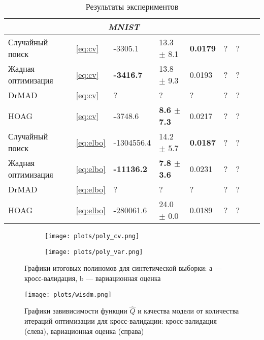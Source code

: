 \begin{table}
\begin{tabularx}{\textwidth}{ |X|X|X|X|X|X|X|X|X|}
\multicolumn{7}{|c|}{\textit{MNIST}}  \\
\hline
Случайный поиск & ~\eqref{eq:cv} & -3305.1  & 13.3 $\pm$ 8.1  &  \bf 0.0179 & ? & ? \\
\hline
Жадная оптимизация & ~\eqref{eq:cv} & \bf -3416.7 & 13.8 $\pm$ 9.3 & 0.0193 & ? & ?\\
\hline
DrMAD & ~\eqref{eq:cv} & ?  &? &  ? & ? & ?\\
\hline
HOAG & ~\eqref{eq:cv} & -3748.6 & \bf 8.6 $\pm$ 7.3&   0.0217 & ? & ? \\
\hline
Случайный поиск & ~\eqref{eq:elbo} & -1304556.4 &  14.2 $\pm$ 5.7 &  \bf 0.0187 & ? & ? \\
\hline
Жадная оптимизация & ~\eqref{eq:elbo} & \bf -11136.2 & \bf 7.8 $\pm$ 3.6  &   0.0231 & ? & ?\\
\hline
DrMAD & ~\eqref{eq:elbo} & ? &   ? & ? & ? & ? \\
\hline
HOAG & ~\eqref{eq:elbo} &  -280061.6 & 24.0 $\pm$ 0.0  &  0.0189 & ? & ?\\
\hline


\hline
\end{tabularx}
\caption{Результаты экспериментов}
\label{table:table}
\end{table}

    \begin{figure}

    \begin{subfigure}[b]{0.5\textwidth}
    \texttt{[image: plots/poly\_cv.png]}

    \end{subfigure}
    \begin{subfigure}[b]{0.5\textwidth}
    \texttt{[image: plots/poly\_var.png]}

    \end{subfigure}

  \label{fig:poly}
    \caption{Графики итоговых полиномов для синтетической выборки: а --- кросс-валидация, b --- вариационная оценка}
    \end{figure}




    \begin{figure}

    \texttt{[image: plots/wisdm.png]}

    \caption{Графики завивисимости функции $\hat{Q}$ и качества модели от количества итераций оптимизации для кросс-валидации:  кросс-валидация (слева), вариационная оценка (справа)}
    \end{figure}



